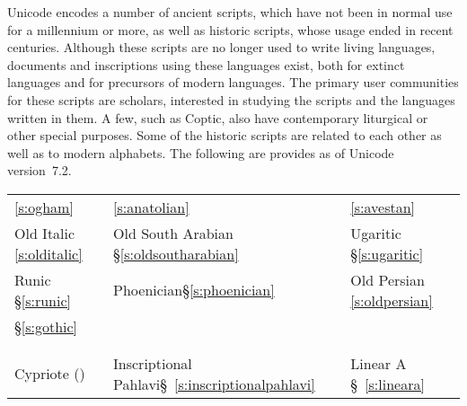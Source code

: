 Unicode encodes a number of ancient scripts, which have not been in normal use for a millennium or more, as well as historic scripts, whose usage ended in recent centuries. Although these scripts are no longer used to write living languages, documents and inscriptions using these languages exist, both for extinct languages and for precursors of modern languages. The primary user communities for these scripts are scholars, interested in studying the scripts and the languages written in them. A few, such as Coptic, also have contemporary liturgical or other special purposes. Some of the historic scripts are related to each other as well as to modern alphabets. The following are provides as of Unicode version~7.2.
\begin{center}
\begin{tabular}{lll}
\ref{s:ogham}           
&\ref{s:anatolian}
&\ref{s:avestan}\\

Old Italic \ref{s:olditalic}      
&Old South Arabian \S\ref{s:oldsoutharabian}          
&Ugaritic \S\ref{s:ugaritic} \\
Runic \S\ref{s:runic}
&Phoenician\S\ref{s:phoenician} 
&Old Persian \ref{s:oldpersian} \\
 \S\ref{s:gothic}            
    
&\nameref{s:imperialaramaic}            
&\nameref{s:sumero} \\

    \nameref{s:oldturkic}   
& \nameref{s:mandaic} 
& \nameref{ch:hieroglyphics}\\

 \nameref{s:linearb} 
&\nameref{s:parthian}       
&\nameref{s:meroitic}\\

 Cypriote (\pageref{s:cypriot})
&Inscriptional Pahlavi\S\ \ref{s:inscriptionalpahlavi}       
&Linear A \S\ \ref{s:lineara}\\
\end{tabular}
\end{center}

